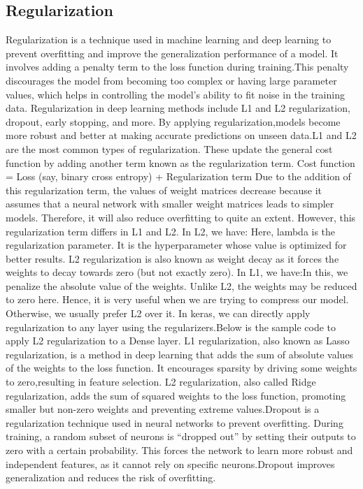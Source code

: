 \subsection{Regularization}
Regularization\cite{AnalyticsVidhya2018Regularization} is a technique used in machine learning and deep learning to prevent overfitting and
improve the generalization performance of a model. It involves adding a penalty term to the loss function during training.This penalty discourages the model from becoming too complex or having large parameter values, which helps in controlling the model’s ability to fit noise in the training data. Regularization in deep learning methods include L1 and L2 regularization, dropout, early stopping, and more. By applying regularization,models become more robust and better at making accurate predictions on unseen data.L1 and L2 are the most common types of regularization. These update the general cost function by adding
another term known as the regularization term.
Cost function = Loss (say, binary cross entropy) + Regularization term
Due to the addition of this regularization term, the values of weight matrices decrease because it assumes
that a neural network with smaller weight matrices leads to simpler models. Therefore, it will also reduce
overfitting to quite an extent.
However, this regularization term differs in L1 and L2.
In L2, we have:
Here, lambda is the regularization parameter. It is the hyperparameter whose value is optimized for better
results. L2 regularization is also known as weight decay as it forces the weights to decay towards zero (but not exactly zero).
In L1, we have:In this, we penalize the absolute value of the weights. Unlike L2, the weights may be reduced to zero here. Hence, it is very useful when we are trying to compress our model. Otherwise, we usually prefer L2 over it.
In keras, we can directly apply regularization to any layer using the regularizers.Below is the sample code to apply L2 regularization to a Dense layer.
 L1 regularization, also known as Lasso regularization, is a method in deep learning that adds the sum of
absolute values of the weights to the loss function. It encourages sparsity by driving some weights to zero,resulting in feature selection. L2 regularization, also called Ridge regularization, adds the sum of squared weights to the loss function, promoting smaller but non-zero weights and preventing extreme values.Dropout is a regularization technique used in neural networks to prevent overfitting. During training, 
a random subset of neurons is “dropped out” by setting their outputs to zero with a certain probability. This forces the network to learn more robust and independent features, as it cannot rely on specific neurons.Dropout improves generalization and reduces the risk of overfitting.

